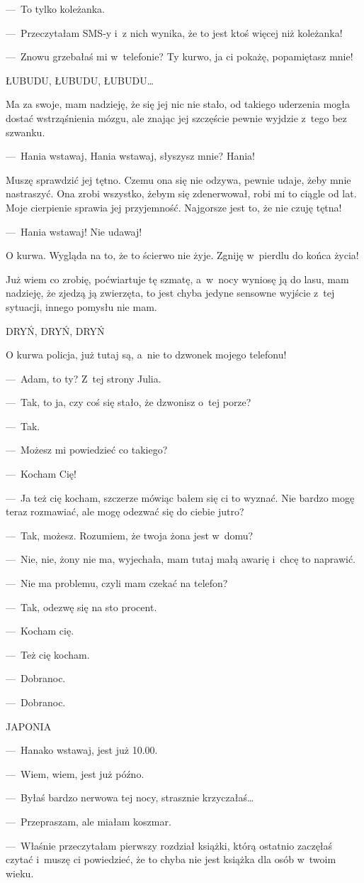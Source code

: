 ---~To tylko koleżanka.

---~Przeczytałam SMS-y i~z nich wynika, że to jest ktoś więcej niż koleżanka!

---~Znowu grzebałaś mi w~telefonie? Ty kurwo, ja ci pokażę, popamiętasz mnie!
 
ŁUBUDU, ŁUBUDU, ŁUBUDU…

Ma za swoje, mam nadzieję, że się jej nic nie stało, od takiego uderzenia mogła dostać wstrząśnienia mózgu, ale 
znając jej szczęście pewnie wyjdzie z~tego bez szwanku.

---~Hania wstawaj, Hania wstawaj, słyszysz mnie? Hania!

Muszę sprawdzić jej tętno. Czemu ona się nie odzywa, pewnie udaje, żeby mnie nastraszyć. Ona zrobi wszystko, żebym 
się zdenerwował, robi mi to ciągle od lat. Moje cierpienie sprawia jej przyjemność. Najgorsze jest to, że nie czuję 
tętna!

---~Hania wstawaj! Nie udawaj!

O kurwa. Wygląda na to, że to ścierwo nie żyje. Zgniję w~pierdlu do końca życia!

Już wiem co zrobię, poćwiartuje tę szmatę, a~w~nocy wyniosę ją do lasu, mam nadzieję, że zjedzą ją zwierzęta, to jest 
chyba jedyne sensowne wyjście z~tej sytuacji, innego pomysłu nie mam.

DRYŃ, DRYŃ, DRYŃ

O kurwa policja, już tutaj są, a~nie to dzwonek mojego telefonu!

---~Adam, to ty? Z~tej strony Julia.

---~Tak, to ja, czy coś się stało, że dzwonisz o~tej porze?

---~Tak.

---~Możesz mi powiedzieć co takiego?

---~Kocham Cię!

---~Ja też cię kocham, szczerze mówiąc bałem się ci to wyznać. Nie bardzo mogę teraz rozmawiać, ale mogę odezwać się 
do ciebie jutro?

---~Tak, możesz. Rozumiem, że twoja żona jest w~domu?

---~Nie, nie, żony nie ma, wyjechała, mam tutaj małą awarię i~chcę to naprawić.

---~Nie ma problemu, czyli mam czekać na telefon?

---~Tak, odezwę się na sto procent.

---~Kocham cię.

---~Też cię kocham.

---~Dobranoc.

---~Dobranoc.

\paraSep
 
JAPONIA
 
---~Hanako wstawaj, jest już 10.00.

---~Wiem, wiem, jest już późno.

---~Byłaś bardzo nerwowa tej nocy, strasznie krzyczałaś…

---~Przepraszam, ale miałam koszmar.

---~Właśnie przeczytałam pierwszy rozdział książki, którą ostatnio zaczęłaś czytać i~muszę ci powiedzieć, że to chyba 
nie jest książka dla osób w~twoim wieku.
